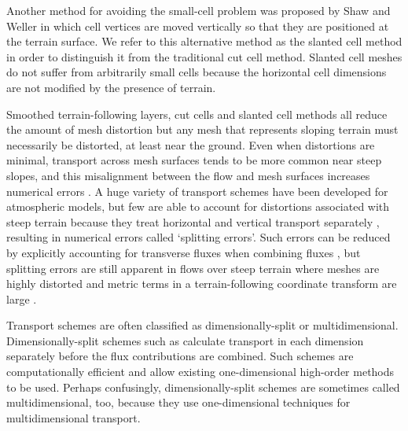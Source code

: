 Another method for avoiding the small-cell problem was proposed by Shaw and Weller \citep{shaw-weller2016} in which cell vertices are moved vertically so that they are positioned at the terrain surface.  We refer to this alternative method as the slanted cell method in order to distinguish it from the traditional cut cell method.  Slanted cell meshes do not suffer from arbitrarily small cells because the horizontal cell dimensions are not modified by the presence of terrain.

Smoothed terrain-following layers, cut cells and slanted cell methods all reduce the amount of mesh distortion but any mesh that represents sloping terrain must necessarily be distorted, at least near the ground.
Even when distortions are minimal, transport across mesh surfaces tends to be more common near steep slopes, and this misalignment between the flow and mesh surfaces increases numerical errors \citep{leonard1993,schaer2002,shaw-weller2016}.
A huge variety of transport schemes have been developed for atmospheric models, but few are able to account for distortions associated with steep terrain because they treat horizontal and vertical transport separately \citep{kent2014}, resulting in numerical errors called `splitting errors'.
Such errors can be reduced by explicitly accounting for transverse fluxes when combining fluxes \citep{leonard1996}, but splitting errors are still apparent in flows over steep terrain where meshes are highly distorted and metric terms in a terrain-following coordinate transform are large \citep{weller2017}.

Transport schemes are often classified as dimensionally-split or multidimensional.
Dimensionally-split schemes such as \citep{lin-rood1996,guo2014} calculate transport in each dimension separately before the flux contributions are combined.  Such schemes are computationally efficient and allow existing one-dimensional high-order methods to be used.
Perhaps confusingly, dimensionally-split schemes are sometimes called multidimensional, too, because they use one-dimensional techniques for multidimensional transport.

